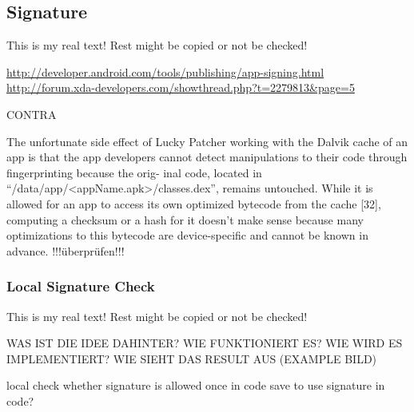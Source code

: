\subsection{Signature}\label{subsection:counter-tampering-signature}

This is my real text! Rest might be copied or not be checked!


\url{http://developer.android.com/tools/publishing/app-signing.html}\newline
\url{http://forum.xda-developers.com/showthread.php?t=2279813&page=5}\newline

CONTRA\newline


The unfortunate side effect of Lucky Patcher working with the Dalvik cache of an app is that the app developers cannot detect manipulations to their code through fingerprinting because the orig- inal code, located in “/data/app/<appName.apk>/classes.dex”, remains untouched. While it is allowed for an app to access its own optimized bytecode from the cache [32], computing a checksum or a hash for it doesn’t make sense because many optimizations to this bytecode are device-specific and cannot be known in advance.
\cite{munteanLicense}
!!!überprüfen!!!


\subsubsection{Local Signature Check} \label{subsubsection:counter-tampering-signature-local}
This is my real text! Rest might be copied or not be checked!



WAS IST DIE IDEE DAHINTER? WIE FUNKTIONIERT ES? WIE WIRD ES IMPLEMENTIERT? WIE SIEHT DAS RESULT AUS (EXAMPLE BILD)\newline

local check whether signature is allowed\newline
once in code \newline
save to use signature in code?\newline



